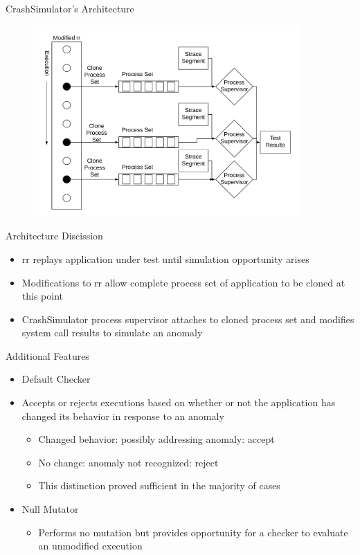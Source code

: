 \documentclass[pdf]{beamer}
\begin{document}
\begin{frame}{CrashSimulator's Architecture}
    \begin{figure}
    \centering
    \includegraphics[width = 0.9\textwidth]{images/architecture}
  \end{figure}
\end{frame}


\begin{frame}{Architecture Discission}
  \begin{itemize}
    \item{rr replays application under test until simulation opportunity
      arises}
    \item{Modifications to rr allow complete process set of application to
      be cloned at this point}
    \item{CrashSimulator process supervisor attaches to cloned process set
      and modifies system call results to simulate an anomaly}
  \end{itemize}
\end{frame}


\begin{frame}{Additional Features}
  \begin{itemize}
    \item{Default Checker}
    \item{Accepts or rejects executions based on whether or not the
      application has changed its behavior in response to an anomaly}
      \begin{itemize}
        \item{Changed behavior: possibly addressing anomaly: accept}
        \item{No change: anomaly not recognized: reject}
        \item{This distinction proved sufficient in the majority of cases}
      \end{itemize}
    \item{Null Mutator}
      \begin{itemize}
        \item{Performs no mutation but provides opportunity for a checker to
          evaluate an unmodified execution}
      \end{itemize}
  \end{itemize}
\end{frame}
\end{document}
